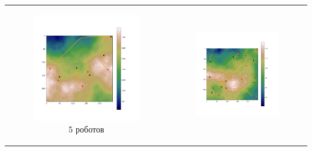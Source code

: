 \documentclass{article}
\begin{document}
	\begin{table}[H]
		\begin{tabular}{c c}
			\begin{subfigure}{0.5\linewidth}
				\includegraphics[width = 1.0\columnwidth]{data/mean_paths/250x250/5.png}
			\caption*{5 роботов}
			\end{subfigure}
			&
			\begin{subfigure}{0.5\linewidth}
				\includegraphics[width = 1.0\columnwidth]{data/mean_paths/250x250/10.png}

\end{subfigure}
\end{tabular}
\end{table}
\end{document}
